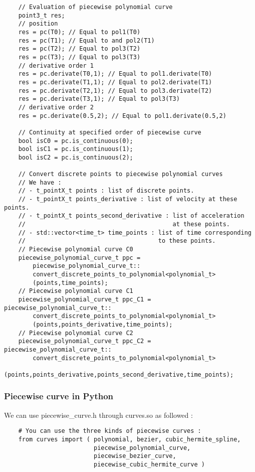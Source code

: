 \documentclass{article}
\begin{document}
\begin{lstlisting}
    // Evaluation of piecewise polynomial curve
    point3_t res;
    // position
    res = pc(T0); // Equal to pol1(T0)
    res = pc(T1); // Equal to and pol2(T1)
    res = pc(T2); // Equal to pol3(T2)
    res = pc(T3); // Equal to pol3(T3)
    // derivative order 1
    res = pc.derivate(T0,1); // Equal to pol1.derivate(T0)
    res = pc.derivate(T1,1); // Equal to pol2.derivate(T1)
    res = pc.derivate(T2,1); // Equal to pol3.derivate(T2)
    res = pc.derivate(T3,1); // Equal to pol3(T3)
    // derivative order 2
    res = pc.derivate(0.5,2); // Equal to pol1.derivate(0.5,2)

    // Continuity at specified order of piecewise curve
    bool isC0 = pc.is_continuous(0);
    bool isC1 = pc.is_continuous(1);
    bool isC2 = pc.is_continuous(2);

    // Convert discrete points to piecewise polynomial curves
    // We have :
    // - t_pointX_t points : list of discrete points.
    // - t_pointX_t points_derivative : list of velocity at these points.
    // - t_pointX_t points_second_derivative : list of acceleration
    //                                         at these points.
    // - std::vector<time_t> time_points : list of time corresponding
    //                                     to these points.
    // Piecewise polynomial curve C0
    piecewise_polynomial_curve_t ppc =
        piecewise_polynomial_curve_t::
        convert_discrete_points_to_polynomial<polynomial_t>
        (points,time_points);
    // Piecewise polynomial curve C1
    piecewise_polynomial_curve_t ppc_C1 =  piecewise_polynomial_curve_t::
        convert_discrete_points_to_polynomial<polynomial_t>
        (points,points_derivative,time_points);
    // Piecewise polynomial curve C2
    piecewise_polynomial_curve_t ppc_C2 =  piecewise_polynomial_curve_t::
        convert_discrete_points_to_polynomial<polynomial_t>
        (points,points_derivative,points_second_derivative,time_points);
    \end{lstlisting}

    \subsubsection{Piecewise curve in Python}
    We can use piecewise\_curve.h through curves.so as followed :
    \begin{lstlisting}
    # You can use the three kinds of piecewise curves :
    from curves import ( polynomial, bezier, cubic_hermite_spline,
                         piecewise_polynomial_curve,
                         piecewise_bezier_curve,
                         piecewise_cubic_hermite_curve )
    \end{lstlisting}
\end{document}
